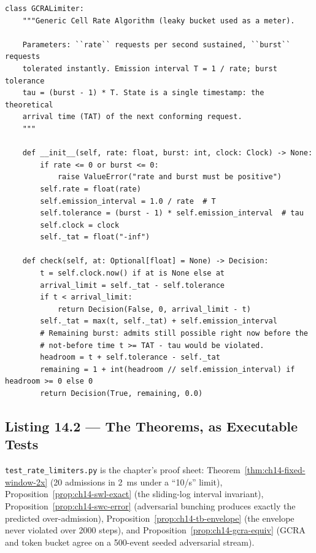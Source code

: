 \begin{verbatim}
class GCRALimiter:
    """Generic Cell Rate Algorithm (leaky bucket used as a meter).

    Parameters: ``rate`` requests per second sustained, ``burst`` requests
    tolerated instantly. Emission interval T = 1 / rate; burst tolerance
    tau = (burst - 1) * T. State is a single timestamp: the theoretical
    arrival time (TAT) of the next conforming request.
    """

    def __init__(self, rate: float, burst: int, clock: Clock) -> None:
        if rate <= 0 or burst <= 0:
            raise ValueError("rate and burst must be positive")
        self.rate = float(rate)
        self.emission_interval = 1.0 / rate  # T
        self.tolerance = (burst - 1) * self.emission_interval  # tau
        self.clock = clock
        self._tat = float("-inf")

    def check(self, at: Optional[float] = None) -> Decision:
        t = self.clock.now() if at is None else at
        arrival_limit = self._tat - self.tolerance
        if t < arrival_limit:
            return Decision(False, 0, arrival_limit - t)
        self._tat = max(t, self._tat) + self.emission_interval
        # Remaining burst: admits still possible right now before the
        # not-before time t >= TAT - tau would be violated.
        headroom = t + self.tolerance - self._tat
        remaining = 1 + int(headroom // self.emission_interval) if headroom >= 0 else 0
        return Decision(True, remaining, 0.0)
\end{verbatim}

\subsection{Listing 14.2 --- The Theorems, as Executable Tests}
\label{subsec:ch14-listing-tests}

\texttt{test\_rate\_limiters.py} is the chapter's proof sheet:
Theorem~\ref{thm:ch14-fixed-window-2x} (20 admissions in 2~ms under a
``10/s'' limit), Proposition~\ref{prop:ch14-swl-exact} (the sliding-log
interval invariant), Proposition~\ref{prop:ch14-swc-error} (adversarial
bunching produces exactly the predicted over-admission),
Proposition~\ref{prop:ch14-tb-envelope} (the envelope never violated over
2000 steps), and Proposition~\ref{prop:ch14-gcra-equiv} (GCRA and token
bucket agree on a 500-event seeded adversarial stream).

